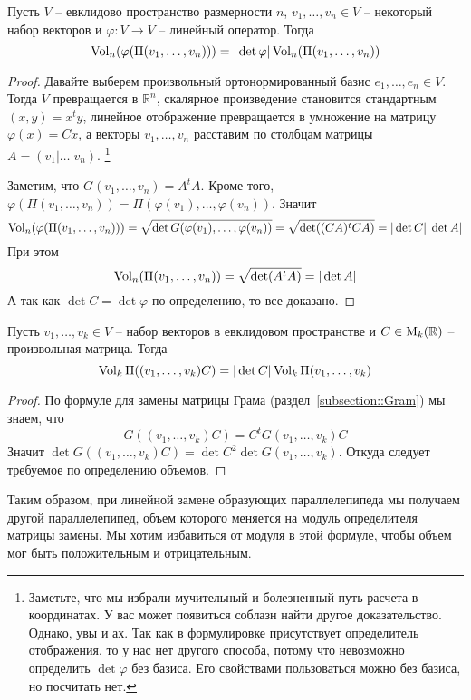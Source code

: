 \begin{claim}
Пусть $V$ -- евклидово пространство размерности $n$, $v_1,\ldots,v_n\in V$ -- некоторый набор векторов и $\varphi\colon V\to V$ -- линейный оператор.
Тогда 
\[
\operatorname{Vol}_n(\varphi(\Pi(v_1,\ldots,v_n))) = |\det \varphi| \operatorname{Vol}_n(\Pi(v_1,\ldots,v_n))
\]
\end{claim}
\begin{proof}
Давайте выберем произвольный ортонормированный базис $e_1,\ldots,e_n\in V$.
Тогда $V$ превращается в $\mathbb R^n$, скалярное произведение становится стандартным $(x, y) = x^t y$, линейное отображение превращается в умножение на матрицу $\varphi(x) = Cx$, а векторы $v_1,\ldots,v_n$ расставим по столбцам матрицы $A = (v_1|\ldots|v_n)$.%
\footnote{Заметьте, что мы избрали мучительный и болезненный путь расчета в координатах.
У вас может появиться соблазн найти другое доказательство.
Однако, увы и ах.
Так как в формулировке присутствует определитель отображения, то у нас нет другого способа, потому что невозможно определить $\det \varphi$ без базиса.
Его свойствами пользоваться можно без базиса, но посчитать нет.}

Заметим, что $G(v_1,\ldots,v_n) = A^t A$.
Кроме того, $\varphi(\Pi(v_1,\ldots,v_n)) = \Pi(\varphi(v_1),\ldots,\varphi(v_n))$.
Значит
\[
\operatorname{Vol}_n(\varphi(\Pi(v_1,\ldots,v_n))) =\sqrt{\det G(\varphi(v_1),\ldots,\varphi(v_n))} = \sqrt{\det ((CA)^tCA)} = |\det C| |\det A|
\]
При этом 
\[
\operatorname{Vol}_n(\Pi(v_1,\ldots,v_n)) = \sqrt{\det(A^tA)} = |\det A|
\]
А так как $\det C = \det \varphi$ по определению, то все доказано.
\end{proof}

\begin{claim}
\label{claim::Volume}
Пусть $v_1,\ldots,v_k\in V$ -- набор векторов в евклидовом пространстве и $C\in \operatorname{M}_{k}(\mathbb R)$ -- произвольная матрица.
Тогда
\[
\operatorname{Vol}_k\Pi((v_1,\ldots,v_k)C) = |\det C| \operatorname{Vol}_k\Pi(v_1,\ldots,v_k)
\]
\end{claim}
\begin{proof}
По формуле для замены матрицы Грама (раздел~\ref{subsection::Gram}) мы знаем, что
\[
G((v_1,\ldots,v_k)C) = C^t G(v_1,\ldots,v_k) C
\]
Значит $\det G((v_1,\ldots,v_k)C) = \det C^2 \det G(v_1,\ldots,v_k)$.
Откуда следует требуемое по определению объемов.
\end{proof}

Таким образом, при линейной замене образующих параллелепипеда мы получаем другой параллелепипед, объем которого меняется на модуль определителя матрицы замены.
Мы хотим избавиться от модуля в этой формуле, чтобы объем мог быть положительным и отрицательным.

